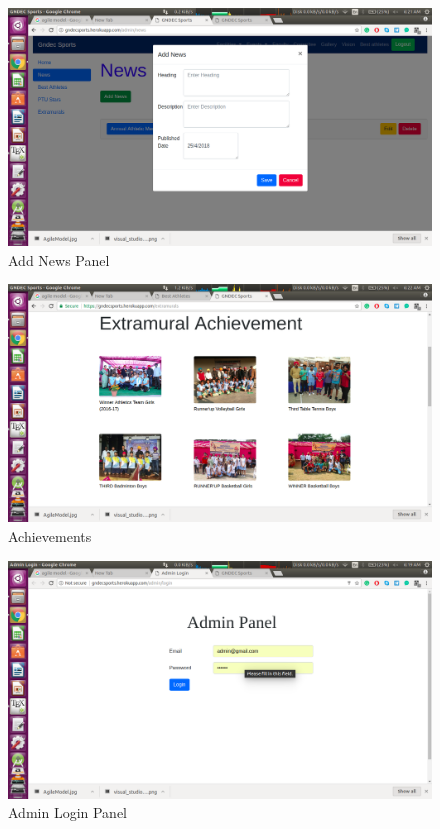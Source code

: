 \newpage

\begin{figure}[ht]
\centering
\includegraphics[scale=0.35]{images/AddNewsHeroku.png}
\caption{Add News Panel}
\end{figure}

\newpage

\begin{figure}[ht]
\centering
\includegraphics[scale=0.35]{images/AchievementHeroku.png}
\caption{Achievements}
\end{figure}

\newpage

\begin{figure}[ht]
\centering
\includegraphics[scale=0.35]{images/AdminPanelHeroku.png}
\caption{Admin Login Panel}
\end{figure}

